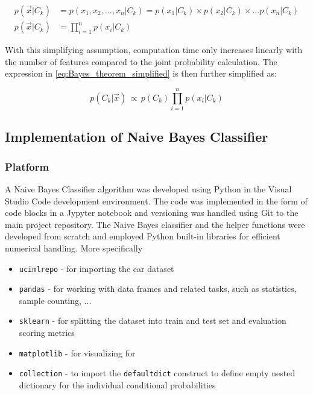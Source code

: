 \documentclass[a4paper]{article}
\begin{document}
\begin{equation}
\begin{aligned}
    p(\vec x|C_k) &= p(x_1, x_2 , ... , x_n|C_k) = p(x_1|C_k)\times p(x_2|C_k) \times ... p(x_n|C_k) \\
    p(\vec x|C_k) &= \prod_{i=1}^n p(x_i|C_k)
\end{aligned}
\end{equation}

With this simplifying assumption, computation time only increases linearly with the number of features compared to the joint probability calculation. The expression in \cref{eq:Bayes_theorem_simplified} is then further simplified as:

\begin{equation}
     p(C_k|\vec{x}) \, \propto \, p(C_k) \prod_{i=1}^n p(x_i|C_k)
\end{equation}


\subsection{Implementation of Naive Bayes Classifier}

\subsubsection{Platform} \label{subsubsec:platform}

A Naive Bayes Classifier algorithm was developed using Python in the Visual Studio Code development environment. The code was implemented in the form of code blocks in a Jypyter notebook and versioning was handled using Git to the main project repository. The Naive Bayes classifier and the helper functions were developed from scratch and employed Python built-in libraries for efficient numerical handling. More specifically

\begin{itemize}
    \item \lstinline{ucimlrepo} - for importing the car dataset
    \item \lstinline{pandas} - for working with data frames and related tasks, such as statistics, sample counting, ...
    \item \lstinline{sklearn} - for splitting the dataset into train and test set and evaluation scoring metrics 
    \item \lstinline{matplotlib} - for visualizing for 
    \item \lstinline{collection} - to import the \lstinline{defaultdict} construct to define empty nested dictionary for the individual conditional probabilities
\end{itemize}
\end{document}
